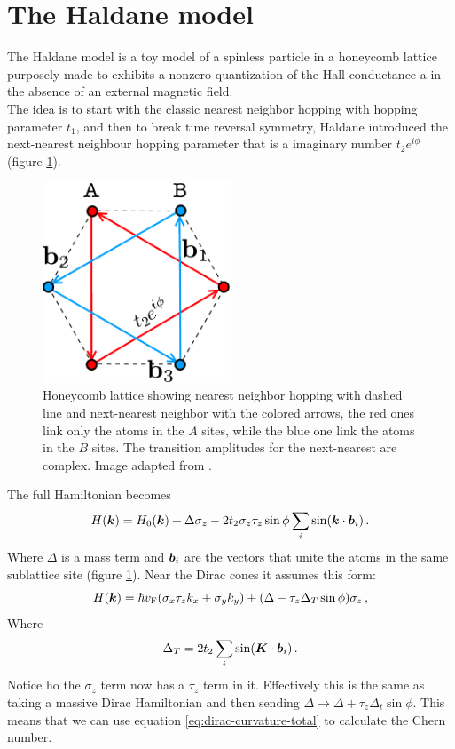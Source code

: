 \section{The Haldane model}
    The Haldane model is a toy model of a spinless particle in a honeycomb lattice purposely made to exhibits a nonzero quantization of the Hall conductance a in the absence of an external magnetic field.\\
    The idea is to start with the classic nearest neighbor hopping with hopping parameter $t_1$, and then to break time reversal symmetry, Haldane introduced the next-nearest neighbour hopping parameter that is a imaginary number $t_2e^{i\phi}$ (figure \ref{fig:second-nearest}).
    \begin{figure}[h]
        \centering
        \includegraphics[width=0.5\textwidth]{Immagini/ValleyHall/Haldane-second-nearest.pdf}
        \caption{Honeycomb lattice showing nearest neighbor hopping with dashed line and next-nearest neighbor with the colored arrows, the red ones link only the atoms in the $A$ sites, while the blue one link the atoms in the $B$ sites. The transition amplitudes for the next-nearest are complex. Image adapted from \cite{topocondmat}.}
        \label{fig:second-nearest}
    \end{figure}
    The full Hamiltonian becomes 
    \begin{equation}
        H(\boldsymbol{k})=H_0(\boldsymbol{k}) +\Delta\sigma_z -2t_2\sigma_z\tau_z\sin\phi\sum_i \sin(\boldsymbol{k}\cdot \boldsymbol{b}_i)\,.
    \end{equation}
    Where $\Delta$ is a mass term and $\boldsymbol{b}_i$ are the vectors that unite the atoms in the same sublattice site (figure \ref{fig:second-nearest}).
    Near the Dirac cones it assumes this form:
    \begin{equation}
            H(\boldsymbol{k})=\hbar v_\textrm{F}(\sigma_x\tau_zk_x+\sigma_yk_y) +
            (\Delta - \tau_z\Delta_T\sin\phi)\sigma_z\,,
    \end{equation}
    Where
    \begin{equation}
        \Delta_T=2t_2\sum_i \sin(\boldsymbol{K}\cdot \boldsymbol{b}_i)\,.
    \end{equation}
    Notice ho the $\sigma_z$ term now has a $\tau_z$ term in it. Effectively this is the same as taking a massive Dirac Hamiltonian and then sending $\Delta\to\Delta + \tau_z\Delta_t\sin\phi$. This means that we can use equation \ref{eq:dirac-curvature-total} to calculate the Chern number.
    
